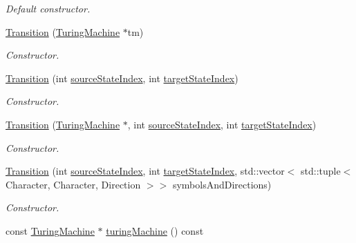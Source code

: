\begin{DoxyCompactItemize}
\begin{DoxyCompactList}\small\item\em \-Default constructor. \end{DoxyCompactList}\item 
\hyperlink{classtum_1_1_transition_af7b719279a1f9de452baf8c1d856032b}{\-Transition} (\hyperlink{classtum_1_1_turing_machine}{\-Turing\-Machine} $\ast$tm)
\begin{DoxyCompactList}\small\item\em \-Constructor. \end{DoxyCompactList}\item 
\hyperlink{classtum_1_1_transition_adb12105740c3378d2f439f82930853b6}{\-Transition} (int \hyperlink{classtum_1_1_transition_aae73e6b6e9720d75f557a3b847b2ccfe}{source\-State\-Index}, int \hyperlink{classtum_1_1_transition_aed4183fe6e6ec81d162e200689fb1022}{target\-State\-Index})
\begin{DoxyCompactList}\small\item\em \-Constructor. \end{DoxyCompactList}\item 
\hyperlink{classtum_1_1_transition_aac25b7108a75450a76ef25d653fb0d11}{\-Transition} (\hyperlink{classtum_1_1_turing_machine}{\-Turing\-Machine} $\ast$, int \hyperlink{classtum_1_1_transition_aae73e6b6e9720d75f557a3b847b2ccfe}{source\-State\-Index}, int \hyperlink{classtum_1_1_transition_aed4183fe6e6ec81d162e200689fb1022}{target\-State\-Index})
\begin{DoxyCompactList}\small\item\em \-Constructor. \end{DoxyCompactList}\item 
\hyperlink{classtum_1_1_transition_acdfe90d7763a6e08ab05052071bbb4b6}{\-Transition} (int \hyperlink{classtum_1_1_transition_aae73e6b6e9720d75f557a3b847b2ccfe}{source\-State\-Index}, int \hyperlink{classtum_1_1_transition_aed4183fe6e6ec81d162e200689fb1022}{target\-State\-Index}, std\-::vector$<$ std\-::tuple$<$ \-Character, \-Character, \-Direction $>$$>$ symbols\-And\-Directions)
\begin{DoxyCompactList}\small\item\em \-Constructor. \end{DoxyCompactList}\item 
\hypertarget{classtum_1_1_transition_a64652bc9bc758c92db3442e6a671a416}{const \hyperlink{classtum_1_1_turing_machine}{\-Turing\-Machine} $\ast$ \hyperlink{classtum_1_1_transition_a64652bc9bc758c92db3442e6a671a416}{turing\-Machine} () const }\label{classtum_1_1_transition_a64652bc9bc758c92db3442e6a671a416}


\end{DoxyCompactItemize}
